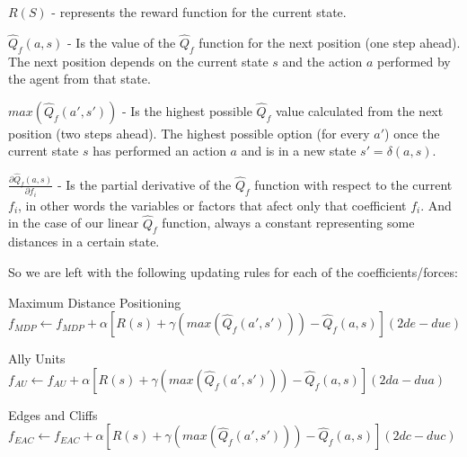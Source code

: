 \begin{flushleft}
$R(S)$ -  represents the reward function for the current state.
\end{flushleft} 

\begin{flushleft}
$\hat{Q}_f(a,s)$ - Is the value of the $\hat{Q}_f$ function for the next position (one step ahead). The next position depends on the current state $s$ and the action $a$ performed by the agent from that state.
\end{flushleft} 

\begin{flushleft}
$max(\hat{Q}_f(a',s'))$ - Is the highest possible $\hat{Q}_f$ value calculated from the next position (two steps ahead). The highest possible option (for every $a'$) once the current state $s$ has performed an action $a$ and is in a new state $s' = \delta(a,s)$. 
\end{flushleft} 

\begin{flushleft}
$\frac{\partial \hat{Q}_f(a,s)}{\partial f_i}$  - Is the partial derivative of the $\hat{Q}_f$ function with respect to the current $f_i$, in other words the variables or factors that afect only that coefficient $f_i$. And in the case of our  linear $\hat{Q}_f$ function, always a constant representing some distances in a certain state. 
\end{flushleft} 

\begin{flushleft}
So we are left with the following updating rules for each of the coefficients/forces:
\end{flushleft} 

\begin{flushleft}
Maximum Distance Positioning 
$f_{MDP}  \leftarrow f_{MDP}  + \alpha [ R(s) + \gamma (max(\hat{Q}_{f} (a',s')))-\hat{Q}_{f} (a,s) ](2de - due)$
\end{flushleft} 

\begin{flushleft}
Ally Units  \\ 
$f_{AU}  \leftarrow f_{AU} + \alpha [ R(s) + \gamma (max(\hat{Q}_{f} (a',s')))-\hat{Q}_{f} (a,s) ](2da - dua)$ 
\end{flushleft} 

\begin{flushleft}
Edges and Cliffs
$f_{EAC}  \leftarrow f_{EAC}  + \alpha [ R(s) + \gamma (max(\hat{Q}_{f} (a',s')))-\hat{Q}_{f} (a,s) ] (2dc - duc)$ 
\end{flushleft} 

